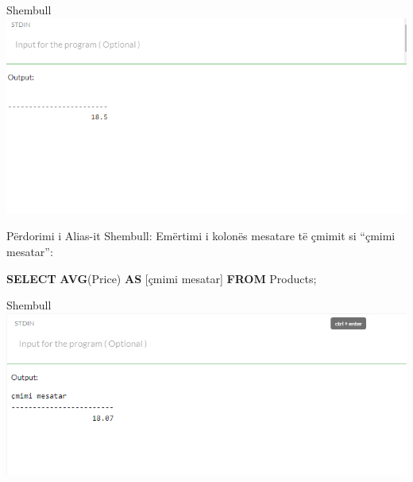 \documentclass[
  ignorenonframetext,
]{beamer}
\newenvironment{Shaded}{\begin{snugshade}}{\end{snugshade}}
\newcommand{\FunctionTok}[1]{\textcolor[rgb]{0.13,0.29,0.53}{\textbf{#1}}}
\newcommand{\KeywordTok}[1]{\textcolor[rgb]{0.13,0.29,0.53}{\textbf{#1}}}
\newcommand{\NormalTok}[1]{#1}
\begin{document}
\begin{frame}{Shembull}
\label{shembull}
\includegraphics{./Figs/query57.png}
\end{frame}

\begin{frame}[fragile]{Përdorimi i Alias-it}
\label{puxebrdorimi-i-alias-it}
Shembull: Emërtimi i kolonës mesatare të çmimit si ``çmimi mesatar'':


\begin{Shaded}
\begin{Highlighting}[]

\KeywordTok{SELECT} \FunctionTok{AVG}\NormalTok{(Price) }\KeywordTok{AS}\NormalTok{ [çmimi mesatar]}
\KeywordTok{FROM}\NormalTok{ Products;}
\end{Highlighting}
\end{Shaded}
\end{frame}

\begin{frame}{Shembull}
\label{shembull-1}
\includegraphics{./Figs/query58.png}
\end{frame}
\end{document}
